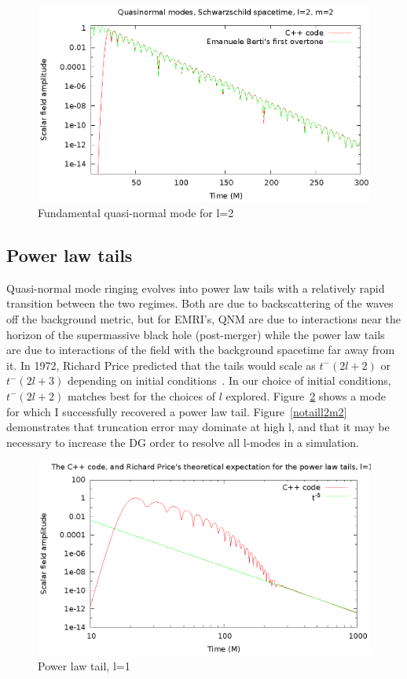 \begin{figure}
  \includegraphics{l2m2qnm}
  \caption{Fundamental quasi-normal mode for l=2}
  \label{qnml2m2}
\end{figure}


\subsection{Power law tails}

Quasi-normal mode ringing evolves into power law tails with a relatively rapid transition between the two regimes. Both are due to backscattering of the waves off the background metric, but for EMRI's, QNM are due to interactions near the horizon of the supermassive black hole (post-merger) while the power law tails are due to interactions of the field with the background spacetime far away from it. In 1972, Richard Price predicted that the tails would scale as $t^-(2l+2)$ or $t^-(2l+3)$ depending on initial conditions~\cite{PriceTails}. In our choice of initial conditions, $t^-(2l+2)$ matches best for the choices of $l$ explored. Figure~\ref{taill1m1} shows a mode for which I successfully recovered a power law tail. Figure~\ref{notaill2m2} demonstrates that truncation error may dominate at high l, and that it may be necessary to increase the DG order to resolve all l-modes in a simulation.

\begin{figure}
  \includegraphics{l1m1tail2}
  \caption{Power law tail, l=1}
  \label{taill1m1}
\end{figure}

